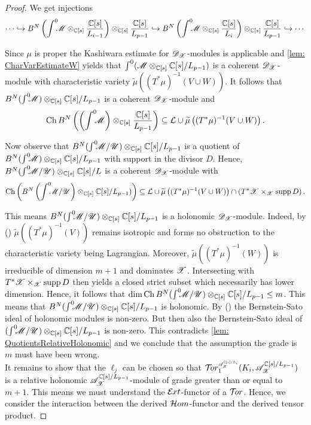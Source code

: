 \begin{proof}
  We get injections
  $$\cdots \hookrightarrow B^N \left(\int^0 \mkern -8mu \mathscr{M}\otimes_{\mathbb{C}[s]}\frac{\mathbb{C}[s]}{L_{i-1}}\right) \otimes_{\mathbb{C}[s]}\frac{\mathbb{C}[s]}{L_{p-1}} \hookrightarrow B^N \left(\int^0 \mkern -8mu\mathscr{M}\otimes_{\mathbb{C}[s]}\frac{\mathbb{C}[s]}{L_i}\right)\otimes_{\mathbb{C}[s]}\frac{\mathbb{C}[s]}{L_{p-1}}\hookrightarrow\cdots  $$

  Since $\mu$ is proper the Kashiwara estimate for $\mathscr{D}_{\mathscr{X}}$-modules is applicable and \cref{lem: CharVarEstimateW} yields that $\int^0(\mathscr{M}\otimes_{\mathbb{C}[s]} \mathbb{C}[s]/L_{p-1})$ is a coherent $\mathscr{D}_{\mathscr{X}}$-module with characteristic variety $\widetilde{\mu}\left((T^*\mu)^{-1}(V\cup W)\right)$.
  It follows that $B^N(\int^0 \mkern -8mu\mathscr{M})\otimes_{\mathbb{C}[s]}\mathbb{C}[s]/L_{p-1}$ is a coherent $\mathscr{D}_{\mathscr{X}}$-module
  and
  $$ \operatorname{Ch} B^N \left(\left(\int^0 \mkern -8mu\mathscr{M}\right)\otimes_{\mathbb{C}[s]}\frac{\mathbb{C}[s]}{L_{p-1}}\right)\subseteq \mathcal{L} \cup \widetilde{\mu}\left((T^*\mu)^{-1}(V\cup W)\right).$$

  Now observe that $B^N(\int^0 \mkern -8mu\mathscr{M}/ \mathscr{U})\otimes_{\mathbb{C}[s]}\mathbb{C}[s]/L_{p-1}$ is a quotient of $B^N(\int^0 \mkern -8mu\mathscr{M}) \otimes_{\mathbb{C}[s]} \mathbb{C}[s]/L_{p-1}$ with support in the divisor $D$.
  Hence, $B^N(\int^0 \mkern -8mu\mathscr{M}/ \mathscr{U})\otimes_{\mathbb{C}[s]}\mathbb{C}[s]/L$ is a coherent $\mathscr{D}_{\mathscr{X}}$-module with
  $$\operatorname{Ch}\left( B^N\left(\int^0 \mkern -8mu\mathscr{M}/ \mathscr{U}\right)\otimes_{\mathbb{C}[s]}\mathbb{C}[s]/L_{p-1}) \right)\subseteq \mathcal{L} \cup \widetilde{\mu}\left((T^*\mu)^{-1}(V\cup W)\right) \cap \left(T^*\mathscr{X}\times_{\mathscr{X}} \operatorname{supp} D\right).$$

  This means $B^N(\int^0 \mkern -8mu\mathscr{M}/ \mathscr{U})\otimes_{\mathbb{C}[s]}\mathbb{C}[s]/L_{p-1}$ is a holonomic $\mathscr{D}_{\mathscr{X}}$-module.
  Indeed, by () $\widetilde{\mu}((T^*\mu)^{-1}(V))$ remains isotropic and forms no obstruction to the characteristic variety being Lagrangian.
  Moreover, $\widetilde{\mu}((T^*\mu)^{-1}(W))$ is irreducible of dimension $m+1$ and dominates $\mathscr{X}$.
  Intersecting with $T^*\mathscr{X}\times_{\mathscr{X}} \operatorname{supp} D$ then yields a closed strict subset which necessarily has lower dimension.
  Hence, it follows that $\dim \operatorname{Ch} B^N (\int^0 \mkern -8mu\mathscr{M}/ \mathscr{U})\otimes_{\mathbb{C}[s]}\mathbb{C}[s]/L_{p-1} \leq m$.
  This means that $B^N(\int^0 \mkern -8mu\mathscr{M}/ \mathscr{U})\otimes_{\mathbb{C}[s]}\mathbb{C}[s]/L_{p-1}$ is holonomic.
  By () the Bernstein-Sato ideal of holonomic modules is non-zero.
  But then also the Bernstein-Sato ideal of $(\int^0 \mkern -8mu\mathscr{M}/ \mathscr{U})\otimes_{\mathbb{C}[s]}\mathbb{C}[s]/L_{p-1}$ is non-zero.
  This contradicts \cref{lem: QuotientsRelativeHolonomic} and we conclude that the assumption the grade is $m$ must have been wrong.\\

  It remains to show that the $\ell_j$ can be chosen so that $\Tr{\A_\X^{\C[s]/L_i} }{1}(K_i, \A_\X^{\C[s]/L_{p-1}})$ is a relative holonomic $\mathscr{A}_{\mathscr{X}}^{\mathbb{C}[s]/L_{p-1}}$-module of grade greater than or equal to $m+1$.
  This means we must understand the $\mathcal{E}\mkern -1mu xt$-functor of a $\mathcal{T}\mkern -3mu or$.
  Hence, we consider the interaction between the derived $\mathcal{H}om$-functor and the derived tensor product.


\end{proof}
